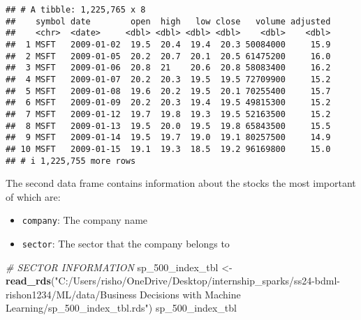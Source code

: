 \documentclass[
]{article}
\newenvironment{Shaded}{\begin{snugshade}}{\end{snugshade}}
\newcommand{\CommentTok}[1]{\textcolor[rgb]{0.56,0.35,0.01}{\textit{#1}}}
\newcommand{\FunctionTok}[1]{\textcolor[rgb]{0.13,0.29,0.53}{\textbf{#1}}}
\newcommand{\NormalTok}[1]{#1}
\newcommand{\OtherTok}[1]{\textcolor[rgb]{0.56,0.35,0.01}{#1}}
\newcommand{\StringTok}[1]{\textcolor[rgb]{0.31,0.60,0.02}{#1}}
\providecommand{\tightlist}{%
  \setlength{\itemsep}{0pt}\setlength{\parskip}{0pt}}
\begin{document}
\begin{verbatim}
## # A tibble: 1,225,765 x 8
##    symbol date        open  high   low close   volume adjusted
##    <chr>  <date>     <dbl> <dbl> <dbl> <dbl>    <dbl>    <dbl>
##  1 MSFT   2009-01-02  19.5  20.4  19.4  20.3 50084000     15.9
##  2 MSFT   2009-01-05  20.2  20.7  20.1  20.5 61475200     16.0
##  3 MSFT   2009-01-06  20.8  21    20.6  20.8 58083400     16.2
##  4 MSFT   2009-01-07  20.2  20.3  19.5  19.5 72709900     15.2
##  5 MSFT   2009-01-08  19.6  20.2  19.5  20.1 70255400     15.7
##  6 MSFT   2009-01-09  20.2  20.3  19.4  19.5 49815300     15.2
##  7 MSFT   2009-01-12  19.7  19.8  19.3  19.5 52163500     15.2
##  8 MSFT   2009-01-13  19.5  20.0  19.5  19.8 65843500     15.5
##  9 MSFT   2009-01-14  19.5  19.7  19.0  19.1 80257500     14.9
## 10 MSFT   2009-01-15  19.1  19.3  18.5  19.2 96169800     15.0
## # i 1,225,755 more rows
\end{verbatim}

The second data frame contains information about the stocks the most
important of which are:

\begin{itemize}
\tightlist
\item
  \texttt{company}: The company name
\item
  \texttt{sector}: The sector that the company belongs to
\end{itemize}

\begin{Shaded}
\begin{Highlighting}[]
\CommentTok{\# SECTOR INFORMATION}
\NormalTok{sp\_500\_index\_tbl }\OtherTok{\textless{}{-}} \FunctionTok{read\_rds}\NormalTok{(}\StringTok{"C:/Users/risho/OneDrive/Desktop/internship\_sparks/ss24{-}bdml{-}rishon1234/ML/data/Business Decisions with Machine Learning/sp\_500\_index\_tbl.rds"}\NormalTok{)}
\NormalTok{sp\_500\_index\_tbl}
\end{Highlighting}
\end{Shaded}
\end{document}
